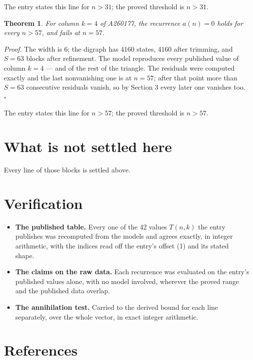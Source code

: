 \documentclass[11pt]{article}
\newtheorem{theorem}{Theorem}
\theoremstyle{definition}
\begin{document}
The entry states this line for $n > 31$; the proved threshold is $n > 31$.

\begin{theorem} For column $k = 4$ of A260177, the recurrence $a(n) = 0$ holds for every $n > 57$, and fails at $n = 57$.\end{theorem}

{\itshape Proof.} The width is $6$; the digraph has $4160$ states, $4160$ after trimming, and $S = 63$ blocks after refinement. The model reproduces every published value of column $k = 4$ --- and of the rest of the triangle. The residuals were computed exactly and the last nonvanishing one is at $n = 57$; after that point more than $S = 63$ consecutive residuals vanish, so by Section 3 every later one vanishes too. $\square$

The entry states this line for $n > 57$; the proved threshold is $n > 57$.

\section{What is not settled here}

Every line of those blocks is settled above.

\section{Verification}

\begin{itemize}

\item {\bfseries The published table.} Every one of the 42 values $T(n,k)$ the entry publishes was recomputed from the models and agrees exactly, in integer arithmetic, with the indices read off the entry's offset (1) and its stated shape.

\item {\bfseries The claims on the raw data.} Each recurrence was evaluated on the entry's published values alone, with no model involved, wherever the proved range and the published data overlap.

\item {\bfseries The annihilation test.} Carried to the derived bound for each line separately, over the whole vector, in exact integer arithmetic.

\end{itemize}

\section{References}
\end{document}
